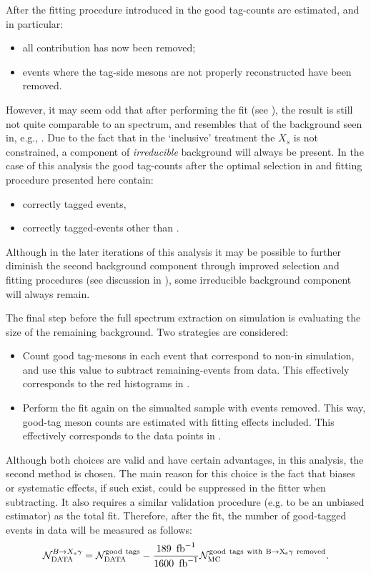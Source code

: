 After the fitting procedure introduced in  the good tag-\B counts are estimated, and in particular:
\begin{itemize}
    \item all \epem\ra\qqbar contribution has now been removed;
    \item events where the tag-side \B mesons are not properly reconstructed have been removed.
\end{itemize}

However, it may seem odd that after performing the \Mbc fit (see ), the result is still not quite comparable to an \EB spectrum,
and resembles that of the background seen in, e.g., .
Due to the fact that in the `inclusive' treatment the $X_s$ is not constrained, a component of \textit{irreducible} background will always be present.
In the case of this analysis the good tag-\B counts after the optimal selection in  and fitting procedure presented here contain:
\begin{itemize}
    \item correctly tagged \BtoXsgamma events,
    \item correctly tagged-\BB events other than \BtoXsgamma.
\end{itemize}
Although in the later iterations of this analysis it may be possible to further diminish the second background component through improved selection and fitting procedures (see discussion in ), 
some irreducible background component will always remain.

The final step before the full \BtoXsgamma spectrum extraction on simulation is evaluating the size of the remaining \BB background.
Two strategies are considered:
\begin{itemize}
    \item Count good tag-\B mesons in each event that correspond to non-\BtoXsgamma in simulation, and use this value to subtract remaining-\BB events from data.
    This effectively corresponds to the red histograms in .
    \item Perform the fit again on the simualted sample with \BtoXsgamma events removed.
    This way, good-tag \B meson counts are estimated with fitting effects included.
    This effectively corresponds to the data points in .
\end{itemize}
Although both choices are valid and have certain advantages, in this analysis, the second method is chosen.
The main reason for this choice is the fact that biases or systematic effects, if such exist, could be suppressed in the fitter when subtracting.
It also requires a similar validation procedure (e.g. to be an unbiased estimator) as the total fit.
Therefore, after the \Mbc fit, the number of good-tagged \BtoXsgamma events in data will be measured as follows:
\begin{equation}\label{eq:background_subtraction}
    \mathcal{N}_{\mathrm{DATA}}^{\BtoXsgamma} = \mathcal{N}_{\mathrm{DATA}}^{\mathrm{good~tags}}  - \frac{189~\invfb}{1600~\invfb} \mathcal{N}_{\mathrm{MC}}^{\mathrm{good~tags~with~\BtoXsgamma~removed}}.
\end{equation}